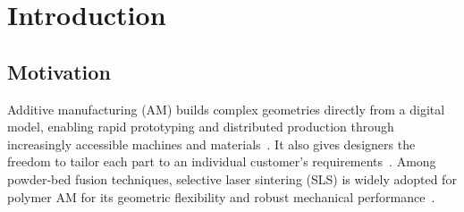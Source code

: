 \newcommand{\Qrf}{\ensuremath{Q_{\mathrm{rf}}}}
\newcommand{\Tphi}{\ensuremath{T_{\varphi_{0.90}}}}
\newcommand{\sigT}{\ensuremath{\sigma_T}}
\newcommand{\rhorel}{\ensuremath{\rho_{\mathrm{rel}}}}
\newcommand{\phimelt}{\ensuremath{\varphi}}
\newcommand{\satmap}{\ensuremath{s(x,y)}}
\newcommand{\Tpc}{\ensuremath{T_{\mathrm{pc}}}}
\newcommand{\bndstd}{\ensuremath{\sigma_{\mathrm{bnd}}}}

\newcommand{\EPE}{\ensuremath{\mathrm{EPE}}}
\newcommand{\Leff}{\ensuremath{L_{\mathrm{eff}}}}
\newcommand{\RMSE}{\ensuremath{\mathrm{RMSE}}}

\newcommand{\figtodo}[1]{%
  \setlength{\fboxsep}{10pt}%
  \fbox{\begin{minipage}[c][0.30\textheight][c]{0.86\linewidth}%
    \centering\itshape\small \textbf{TODO (figure):}\\[0.4em] #1%
  \end{minipage}}}

\newcommand{\vect}[1]{\boldsymbol{#1}}
\newcommand{\nhat}{\hat{\vect{n}}}
\newcommand{\half}{\tfrac{1}{2}}
\newcommand{\iter}[1]{\textnormal{iter-}#1}
\newcommand{\degC}{$^\circ$C}
\DeclareMathOperator*{\clip}{clip}
\chapter{Introduction}
\label{ch:intro}


\section{Motivation}
\label{sec:intro_motivation}

Additive manufacturing (AM) builds complex geometries directly from a digital model, enabling
rapid prototyping and distributed production through increasingly accessible
machines and materials~\cite{gibson2015additive,Beaman2020AdditiveMR,Yang2015AdditiveMD,yao2016cost,debroy2018additive,bahruni2018technology}.
It also gives designers the freedom to tailor each part to an individual
customer's requirements~\cite{ko2015design}.
Among powder-bed fusion techniques, selective laser sintering (SLS)
is widely adopted for polymer AM for its geometric flexibility and robust
mechanical performance~\cite{deckard1989method,jabri2023comprehensive,lupone2021process}.

